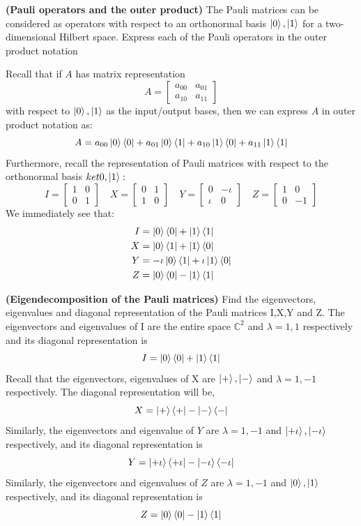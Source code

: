 \begin{example}
    \textbf{(Pauli operators and the outer product)} The Pauli matrices can be considered as operators with respect to an orthonormal basis $\ket{0},\ket{1}$ for a two-dimensional Hilbert space. Express each of the Pauli operators in the outer product notation
    
    Recall that if $A$ has matrix representation
    \[
    A=\begin{bmatrix} a_{00} & a_{01} \\ a_{10} & a_{11} \end{bmatrix}
    \]
    with respect to $\ket{0},\ket{1}$ as the input/output bases, then we can express $A$ in outer product notation as:
    \[
    A=a_{00}\ket{0}\bra{0} + a_{01}\ket{0}\bra{1} + a_{10}\ket{1}\bra{0} + a_{11}\ket{1}\bra{1}
    \]
    Furthermore, recall the representation of Pauli matrices with respect to the orthonormal basis $ket{0},\ket{1}:$
    \[
    I=\begin{bmatrix} 1 & 0 \\ 0 & 1 \end{bmatrix}\quad X=\begin{bmatrix} 0 & 1 \\ 1 & 0 \end{bmatrix} \quad Y=\begin{bmatrix} 0 & -\iota \\ \iota & 0 \end{bmatrix} \quad Z=\begin{bmatrix} 1 & 0 \\ 0 & -1 \end{bmatrix}
    \]
    We immediately see that:
    \begin{align*}
        I&=\ket{0}\bra{0}+\ket{1}\bra{1}\\
        X&=\ket{0}\bra{1}+\ket{1}\bra{0}\\
        Y&=-\iota \ket{0}\bra{1} + \iota \ket{1}\bra{0}\\
        Z&=\ket{0}\bra{0}-\ket{1}\bra{1}
    \end{align*}
\end{example}

\begin{example}
    \textbf{(Eigendecomposition of the Pauli matrices)}
    Find the eigenvectors, eigenvalues and diagonal representation of the Pauli matrices I,X,Y and Z.
    The eigenvectors and eigenvalues of I are the entire space $\mathbb{C}^2$ and $\lambda=1,1$ respectively and its diagonal representation is 
    \[
    I=\ket{0}\bra{0}+\ket{1}\bra{1}
    \]
    Recall that the eigenvectors, eigenvalues of X are $\ket{+},\ket{-}$ and $\lambda=1,-1$ respectively. The diagonal representation will be,
    \[
    X=\ket{+}\bra{+}-\ket{-}\bra{-}
    \]
    Similarly, the eigenvectors and eigenvalue of $Y$ are $\lambda=1,-1$ and $\ket{+\iota},\ket{-\iota}$ respectively, and its diagonal representation is
    \[
    Y=\ket{+\iota}\bra{+\iota}-\ket{-\iota}\bra{-\iota}
    \]
    Similarly, the eigenvectors and eigenvalues of $Z$ are $\lambda=1,-1$ and $\ket{0},\ket{1}$ respectively, and its diagonal representation is
    \[
    Z=\ket{0}\bra{0}-\ket{1}\bra{1}
    \]
\end{example}

